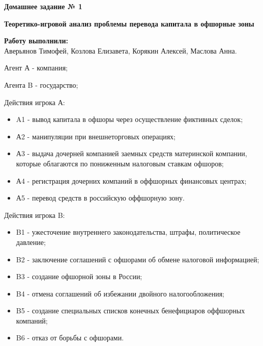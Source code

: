 \documentclass[12pt,a4paper]{article}
\author{GH-TIMe}
\begin{document}
\begin{center}
\textbf{Домашнее задание № 1}
\end{center}
\begin{center}
\textbf{Теоретико-игровой анализ проблемы перевода капитала в офшорные зоны}\\
\end{center}
\begin{flushleft}
 \textbf{Работу выполнили:} \\
Аверьянов Тимофей, Козлова Елизавета, Корякин Алексей, Маслова  Анна.
 \end{flushleft}
 
Агент \textcolor[rgb]{0.82,0.01,0.11}{А} - компания;

Агента \textcolor[rgb]{0.29,0.56,0.89}{B} - государство;

Действия игрока \textcolor[rgb]{0.82,0.01,0.11}{А}\textcolor[rgb]{0,0,0}{:}
\begin{itemize}
\item \textcolor[rgb]{0.82,0.01,0.11}{A1} - вывод капитала в офшоры через осуществление фиктивных сделок;
\item \textcolor[rgb]{0.82,0.01,0.11}{А2} - манипуляции при внешнеторговых операциях;
\item \textcolor[rgb]{0.82,0.01,0.11}{А3} - выдача дочерней компанией заемных средств материнской компании, которые облагаются по пониженным налоговым ставкам офшоров;
\item \textcolor[rgb]{0.82,0.01,0.11}{А4} - регистрация дочерних компаний в оффшорных финансовых центрах;
\item \textcolor[rgb]{0.82,0.01,0.11}{А5} - перевод средств в российскую оффшорную зону.
\end{itemize}

Действия игрока \textcolor[rgb]{0.29,0.56,0.89}{B}\textcolor[rgb]{0,0,0}{:}
\begin{itemize}
\item \textcolor[rgb]{0.29,0.56,0.89}{B1} - ужесточение внутреннего законодательства, штрафы, политическое давление;
\item \textcolor[rgb]{0.29,0.56,0.89}{B2} - заключение соглашений с офшорами об обмене налоговой информацией;
\item \textcolor[rgb]{0.29,0.56,0.89}{B3} - создание офшорной зоны в России;
\item \textcolor[rgb]{0.29,0.56,0.89}{B4} - отмена соглашений об избежании двойного налогообложения;
\item \textcolor[rgb]{0.29,0.56,0.89}{B5} - создание специальных списков конечных бенефициаров оффшорных компаний;
\item \textcolor[rgb]{0.29,0.56,0.89}{B6} - отказ от борьбы с офшорами.
\end{itemize}
\end{document}
